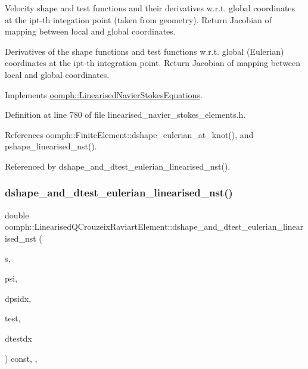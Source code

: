 Velocity shape and test functions and their derivatives w.\+r.\+t. global coordinates at the ipt-\/th integation point (taken from geometry). Return Jacobian of mapping between local and global coordinates. 

Derivatives of the shape functions and test functions w.\+r.\+t. global (Eulerian) coordinates at the ipt-\/th integration point. Return Jacobian of mapping between local and global coordinates. 

Implements \hyperlink{classoomph_1_1LinearisedNavierStokesEquations_a87a2102128bc071afa16f2e950724ee3}{oomph\+::\+Linearised\+Navier\+Stokes\+Equations}.



Definition at line 780 of file linearised\+\_\+navier\+\_\+stokes\+\_\+elements.\+h.



References oomph\+::\+Finite\+Element\+::dshape\+\_\+eulerian\+\_\+at\+\_\+knot(), and pshape\+\_\+linearised\+\_\+nst().



Referenced by dshape\+\_\+and\+\_\+dtest\+\_\+eulerian\+\_\+linearised\+\_\+nst().

\mbox{\label{classoomph_1_1LinearisedQCrouzeixRaviartElement_aa6112ad393ddc9e9a3639eef554173d0}} 
\subsubsection{\texorpdfstring{dshape\+\_\+and\+\_\+dtest\+\_\+eulerian\+\_\+linearised\+\_\+nst()}{dshape\_and\_dtest\_eulerian\_linearised\_nst()}}
{\footnotesize\ttfamily double oomph\+::\+Linearised\+Q\+Crouzeix\+Raviart\+Element\+::dshape\+\_\+and\+\_\+dtest\+\_\+eulerian\+\_\+linearised\+\_\+nst (\begin{DoxyParamCaption}\item[{const \hyperlink{classoomph_1_1Vector}{Vector}$<$ double $>$ \&}]{s,  }\item[{\hyperlink{classoomph_1_1Shape}{Shape} \&}]{psi,  }\item[{\hyperlink{classoomph_1_1DShape}{D\+Shape} \&}]{dpsidx,  }\item[{\hyperlink{classoomph_1_1Shape}{Shape} \&}]{test,  }\item[{\hyperlink{classoomph_1_1DShape}{D\+Shape} \&}]{dtestdx }\end{DoxyParamCaption}) const\hspace{0.3cm}{\ttfamily [inline]}, {\ttfamily [protected]}, {\ttfamily [virtual]}}



